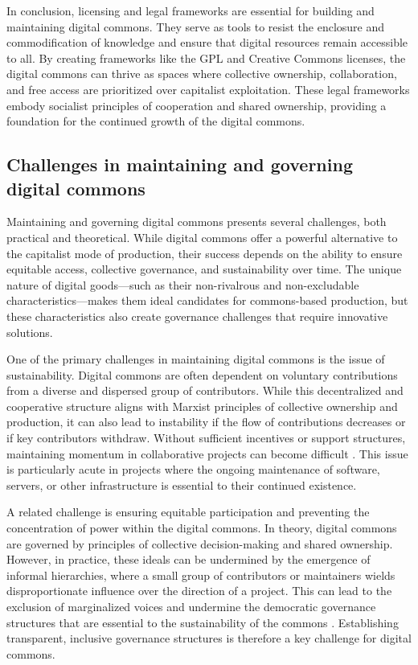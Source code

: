 \begin{refsection}
In conclusion, licensing and legal frameworks are essential for building and maintaining digital commons. They serve as tools to resist the enclosure and commodification of knowledge and ensure that digital resources remain accessible to all. By creating frameworks like the GPL and Creative Commons licenses, the digital commons can thrive as spaces where collective ownership, collaboration, and free access are prioritized over capitalist exploitation. These legal frameworks embody socialist principles of cooperation and shared ownership, providing a foundation for the continued growth of the digital commons.

\subsection{Challenges in maintaining and governing digital commons}

Maintaining and governing digital commons presents several challenges, both practical and theoretical. While digital commons offer a powerful alternative to the capitalist mode of production, their success depends on the ability to ensure equitable access, collective governance, and sustainability over time. The unique nature of digital goods—such as their non-rivalrous and non-excludable characteristics—makes them ideal candidates for commons-based production, but these characteristics also create governance challenges that require innovative solutions.

One of the primary challenges in maintaining digital commons is the issue of sustainability. Digital commons are often dependent on voluntary contributions from a diverse and dispersed group of contributors. While this decentralized and cooperative structure aligns with Marxist principles of collective ownership and production, it can also lead to instability if the flow of contributions decreases or if key contributors withdraw. Without sufficient incentives or support structures, maintaining momentum in collaborative projects can become difficult \cite[pp.~214-216]{raymond2001}. This issue is particularly acute in projects where the ongoing maintenance of software, servers, or other infrastructure is essential to their continued existence.

A related challenge is ensuring equitable participation and preventing the concentration of power within the digital commons. In theory, digital commons are governed by principles of collective decision-making and shared ownership. However, in practice, these ideals can be undermined by the emergence of informal hierarchies, where a small group of contributors or maintainers wields disproportionate influence over the direction of a project. This can lead to the exclusion of marginalized voices and undermine the democratic governance structures that are essential to the sustainability of the commons \cite[pp.~109-110]{ostrom1990}. Establishing transparent, inclusive governance structures is therefore a key challenge for digital commons.


\end{refsection}
